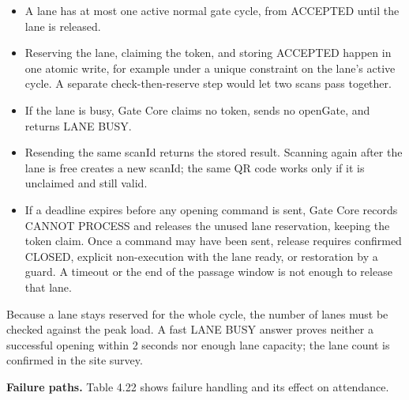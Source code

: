\begin{itemize}[leftmargin=36pt, itemsep=2pt, topsep=4pt, parsep=2pt]
  \item A lane has at most one active normal gate cycle, from ACCEPTED until the lane is released.
  \item Reserving the lane, claiming the token, and storing ACCEPTED happen in one atomic write, for example under a unique constraint on the lane's active cycle. A separate check-then-reserve step would let two scans pass together.
  \item If the lane is busy, Gate Core claims no token, sends no openGate, and returns LANE BUSY.
  \item Resending the same scanId returns the stored result. Scanning again after the lane is free creates a new scanId; the same QR code works only if it is unclaimed and still valid.
  \item If a deadline expires before any opening command is sent, Gate Core records CANNOT PROCESS and releases the unused lane reservation, keeping the token claim. Once a command may have been sent, release requires confirmed CLOSED, explicit non-execution with the lane ready, or restoration by a guard. A timeout or the end of the passage window is not enough to release that lane.
\end{itemize}

Because a lane stays reserved for the whole cycle, the number of lanes must be checked against the peak load. A fast LANE BUSY answer proves neither a successful opening within 2 seconds nor enough lane capacity; the lane count is confirmed in the site survey.

\textbf{Failure paths.} Table 4.22 shows failure handling and its effect on attendance.

